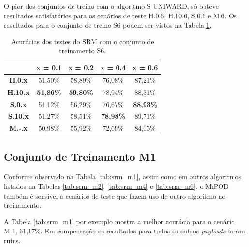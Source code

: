 O pior dos conjuntos de treino com o algoritmo S-UNIWARD, só obteve resultados satisfatórios para os cenários de teste H.0.6, H.10.6, S.0.6 e M.6. Os resultados para o conjunto de treino S6 podem ser vistos na Tabela \ref{tab:suni_s6}. 
\begin{table}[!htb]
\centering
\begin{tabular}{c|c|c|c|c|}
\cline{2-5}
\textbf{}                             & \textbf{x = 0.1} & \textbf{x = 0.2} & \textbf{x = 0.4} & \textbf{x = 0.6} \\ \hline
\multicolumn{1}{|c|}{\textbf{H.0.x}}  & 51,50\%          & 58,89\%          & 76,08\%          & 87,21\%          \\ \hline
\multicolumn{1}{|c|}{\textbf{H.10.x}} & \textbf{51,86\%} & \textbf{59,80\%} & 78,94\% & 88,31\% \\ \hline
\multicolumn{1}{|c|}{\textbf{S.0.x}}  & 51,12\%          & 56,29\%          & 76,67\%          & \textbf{88,93\%}          \\ \hline
\multicolumn{1}{|c|}{\textbf{S.10.x}} & 51,27\%          & 58,51\%          & \textbf{78,98\%}          & 89,71\%          \\ \hline
\multicolumn{1}{|c|}{\textbf{M.-.x}}  & 50,98\%          & 55,92\%          & 72,69\%          & 84,05\%          \\ \hline
\end{tabular}
\caption{Acurácias dos testes do SRM com o conjunto de treinamento S6.}
\label{tab:suni_s6}

\end{table}



\subsection{Conjunto de Treinamento M1}

Conforme observado na Tabela \ref{tab:srm_m1}, assim como em outros algoritmos listados na Tabelas \ref{tab:srm_m2}, \ref{tab:srm_m4}  e \ref{tab:srm_m6}, o MiPOD também é sensível a cenários de teste que fazem uso de outro algoritmo no treinamento.

A Tabela \ref{tab:srm_m1} por exemplo mostra a melhor acurácia para o cenário M.1, 61,17\%. Em compensação os resultados para todos os outros \textit{payloads} foram ruins.

